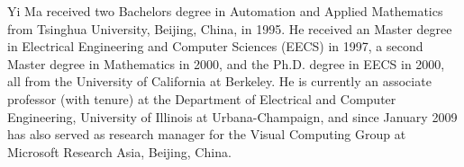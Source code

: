 \documentclass[10pt,journal,letterpaper,compsoc]{IEEEtran}
\begin{document}
\biospace
\begin{IEEEbiography}{Yi
Ma} received two Bachelors degree in Automation and Applied Mathematics
from  Tsinghua University, Beijing, China, in 1995. He received an Master
degree in Electrical Engineering and Computer Sciences (EECS) in 1997, a second
Master degree in Mathematics in 2000, and the Ph.D. degree in EECS in 2000, all
from the University of California at Berkeley. He is currently an associate
professor (with tenure) at the Department of Electrical and Computer
Engineering, University of Illinois at Urbana-Champaign, and since January 2009
has also served as research manager for the Visual Computing Group at Microsoft
Research Asia, Beijing, China.  \end{IEEEbiography}
\end{document}
